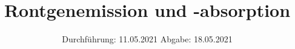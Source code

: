 

\subject{V 602}
\title{Rontgenemission und -absorption}
\date{%
  Durchführung: 11.05.2021
  \hspace{3em}
  Abgabe: 18.05.2021
}



\maketitle
\thispagestyle{empty}
\tableofcontents
\newpage






\printbibliography{}


